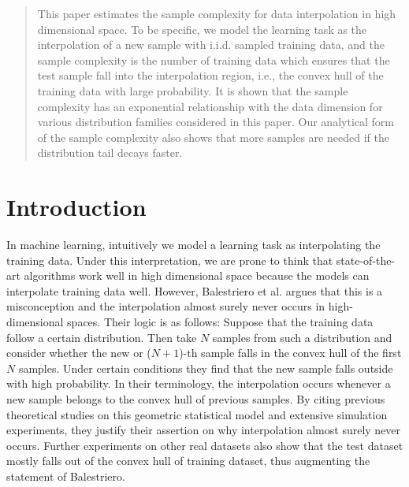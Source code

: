 \documentclass[conference,a4paper]{IEEEtran}
\begin{document}
\maketitle

\begin{abstract}
  This paper estimates the sample complexity for data interpolation in high dimensional space.
  To be specific, we model the learning task as the interpolation of a new sample with i.i.d. sampled training data,
  and the sample complexity is the number of training data which ensures that
  the test sample fall into the interpolation region, i.e., the convex hull
  of the training data with large probability. It is shown that the sample complexity has an exponential relationship with the data dimension for various distribution families
  considered in this paper. Our analytical form of the sample complexity also shows that more samples are needed if the distribution tail decays faster.
\end{abstract}


\section{Introduction}
\label{sec:intro}
In machine learning, intuitively we model a learning task as interpolating the
training data. Under this interpretation, we are prone to think that state-of-the-art
algorithms work well in high dimensional space because the models can interpolate training data well. 
However, Balestriero et al. \cite{balestriero2021learning}
argues that this is a misconception and the interpolation almost surely never occurs in high-dimensional spaces.
Their logic is as follows: Suppose that the training data follow a certain distribution. Then take $N$ samples from such a distribution
and consider whether the new or ($N+1$)-th sample falls in the convex hull of the first $N$ samples. 
Under certain conditions they find that the new sample falls outside with high probability.
In their terminology, the interpolation occurs whenever a new sample belongs to the convex hull of previous samples.
By citing previous theoretical studies on this geometric statistical model and extensive simulation experiments,
they justify their assertion on why interpolation almost surely never occurs.
Further experiments on other real datasets \cite{yousefzadeh2022extent} also show that
the test dataset mostly falls out of the
convex hull of training dataset, thus augmenting the statement of Balestriero.
\end{document}
